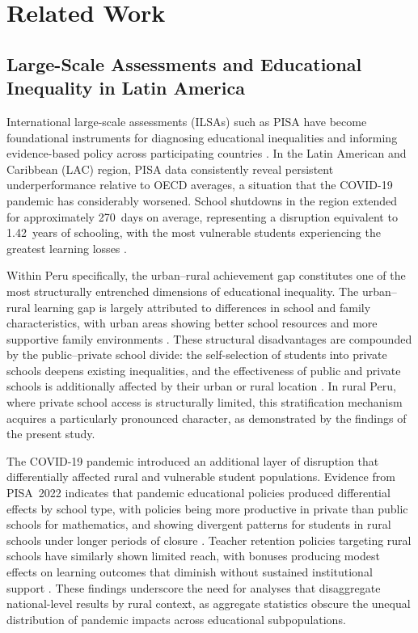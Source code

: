 \documentclass[twocolumn,12pt]{article}
\begin{document}

\section{Related Work}

\subsection{Large-Scale Assessments and Educational Inequality in Latin
America}

International large-scale assessments (ILSAs) such as PISA have become
foundational instruments for diagnosing educational inequalities and
informing evidence-based policy across participating countries
\parencite{rutkowski2010secondary}. In the Latin American and Caribbean
(LAC) region, PISA data consistently reveal persistent underperformance
relative to OECD averages, a situation that the COVID-19 pandemic has
considerably worsened. School shutdowns in the region extended for
approximately 270~days on average, representing a disruption equivalent
to 1.42~years of schooling, with the most vulnerable students experiencing
the greatest learning losses \parencite{delprato2025resilience}.

Within Peru specifically, the urban--rural achievement gap constitutes one
of the most structurally entrenched dimensions of educational inequality.
The urban--rural learning gap is largely attributed to differences in school
and family characteristics, with urban areas showing better school resources
and more supportive family environments \parencite{wang2024urbanrural}.
These structural disadvantages are compounded by the public--private school
divide: the self-selection of students into private schools deepens existing
inequalities, and the effectiveness of public and private schools is
additionally affected by their urban or rural location
\parencite{delprato2025schools}. In rural Peru, where private school access
is structurally limited, this stratification mechanism acquires a
particularly pronounced character, as demonstrated by the findings of the
present study.

The COVID-19 pandemic introduced an additional layer of disruption that
differentially affected rural and vulnerable student populations. Evidence
from PISA~2022 indicates that pandemic educational policies produced
differential effects by school type, with policies being more productive in
private than public schools for mathematics, and showing divergent patterns
for students in rural schools under longer periods of closure
\parencite{delprato2025covid}. Teacher retention policies targeting rural
schools have similarly shown limited reach, with bonuses producing modest
effects on learning outcomes that diminish without sustained institutional
support \parencite{castro2022bonuses}. These findings underscore the need
for analyses that disaggregate national-level results by rural context, as
aggregate statistics obscure the unequal distribution of pandemic impacts
across educational subpopulations.
\end{document}
